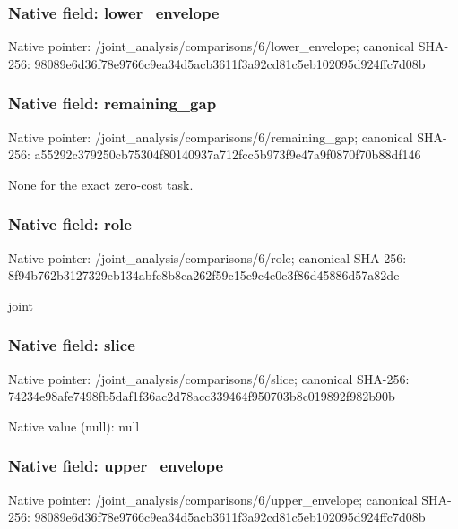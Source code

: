 \documentclass[10pt,a4paper]{article}
\begin{document}
\subsubsection{Native field: lower\_\allowbreak{}envelope}
Native pointer: /joint\_\allowbreak{}analysis/comparisons/6/lower\_\allowbreak{}envelope; canonical SHA-256: 98089e6d36f78e9766c9ea34d5acb3611f3a92cd81c5eb102095d924ffc7d08b

\begingroup\raggedright{}\par\endgroup

\subsubsection{Native field: remaining\_\allowbreak{}gap}
Native pointer: /joint\_\allowbreak{}analysis/comparisons/6/remaining\_\allowbreak{}gap; canonical SHA-256: a55292c379250cb75304f80140937a712fcc5b973f9e47a9f0870f70b88df146

\begingroup\raggedright\sloppy None for the exact zero-cost task.\par\endgroup

\subsubsection{Native field: role}
Native pointer: /joint\_\allowbreak{}analysis/comparisons/6/role; canonical SHA-256: 8f94b762b3127329eb134abfe8b8ca262f59c15e9c4e0e3f86d45886d57a82de

\begingroup\raggedright\sloppy joint\par\endgroup

\subsubsection{Native field: slice}
Native pointer: /joint\_\allowbreak{}analysis/comparisons/6/slice; canonical SHA-256: 74234e98afe7498fb5daf1f36ac2d78acc339464f950703b8c019892f982b90b

Native value (null): null

\subsubsection{Native field: upper\_\allowbreak{}envelope}
Native pointer: /joint\_\allowbreak{}analysis/comparisons/6/upper\_\allowbreak{}envelope; canonical SHA-256: 98089e6d36f78e9766c9ea34d5acb3611f3a92cd81c5eb102095d924ffc7d08b
\end{document}
